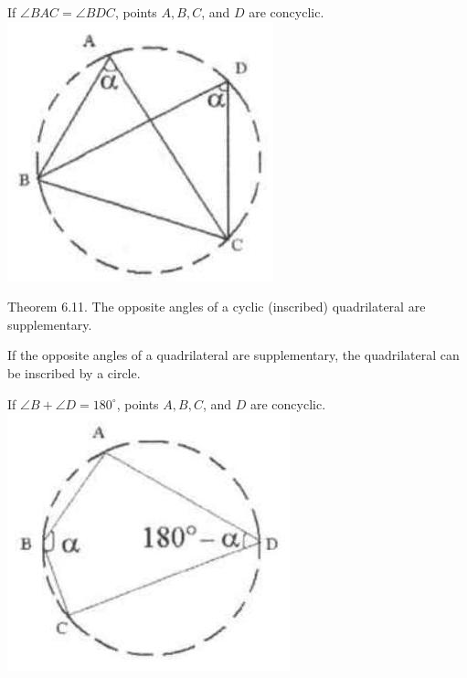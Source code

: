 \documentclass{article}
\begin{document}
If \(\angle B A C=\angle B D C\), points \(A, B, C\), and \(D\) are concyclic.\\
\centering
\includegraphics[width=\textwidth]{images/191(2).jpg}

Theorem 6.11. The opposite angles of a cyclic (inscribed) quadrilateral are supplementary.

If the opposite angles of a quadrilateral are supplementary, the quadrilateral can be inscribed by a circle.

If \(\angle B+\angle D=180^{\circ}\), points \(A, B, C\), and \(D\) are concyclic.\\
\centering
\includegraphics[width=\textwidth]{images/191(1).jpg}
\end{document}
